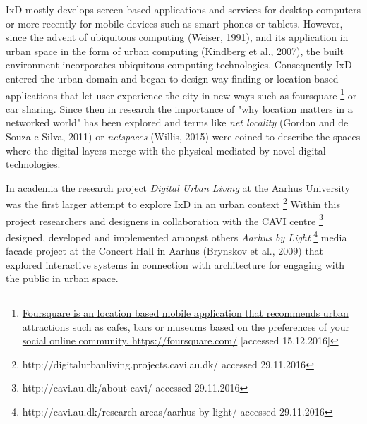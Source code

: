 IxD mostly develops screen-based applications and services for desktop computers or more recently for mobile devices such as smart phones or tablets. However, since the advent of ubiquitous computing (Weiser, 1991), and its application in urban space in the form of urban computing (Kindberg et al., 2007), the built environment incorporates ubiquitous computing technologies. Consequently IxD entered the urban domain and began to design way finding or location based applications that let user experience the city in new ways such as foursquare  \footnote{\url{Foursquare is an location based mobile application that recommends urban attractions such as cafes, bars or museums based on the preferences of your social online community. https://foursquare.com/} [accessed 15.12.2016]} or car sharing. Since then in research the importance of "why location matters in a networked world" has been explored and terms like \textit{net locality}  (Gordon and de Souza e Silva, 2011) or \textit{netspaces} (Willis, 2015) were coined to describe the spaces where the digital layers merge with the physical mediated by novel digital technologies.   

In academia the research project \textit{Digital Urban Living}  at the Aarhus University was the first larger attempt to explore IxD in an urban context \footnote{http://digitalurbanliving.projects.cavi.au.dk/ accessed 29.11.2016} Within this project researchers and designers in collaboration with the CAVI centre \footnote{http://cavi.au.dk/about-cavi/ accessed 29.11.2016} designed, developed and implemented amongst others \textit{Aarhus by Light}  \footnote{http://cavi.au.dk/research-areas/aarhus-by-light/ accessed 29.11.2016} media facade project at the Concert Hall in Aarhus (Brynskov et al., 2009) that explored interactive systems in connection with architecture for engaging with the public in urban space. 



